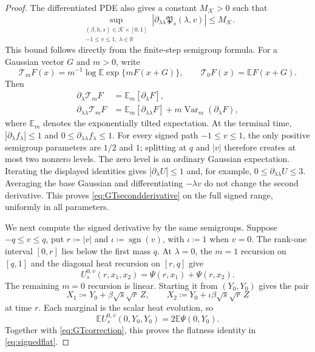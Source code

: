 \documentclass[11pt]{article}
\numberwithin{equation}{section}
\newcommand{\E}{\mathbb{E}}
\newcommand{\1}{\mathbf 1}
\newcommand{\cK}{\mathcal K}
\newcommand{\Var}{\operatorname{Var}}
\begin{document}
\begin{proof}
The differentiated PDE also gives a constant $M_{\cK}>0$ such that
\begin{equation}
 \sup_{\substack{(\beta,h,s)\in\cK\times[0,1]\\
                  -1\le v\le1,\ \lambda\in\mathbb R}}
 |\partial_{\lambda\lambda}\mathfrak P_s(\lambda,v)|
 \le M_{\cK}.
 \label{eq:GTsecondderivative}
\end{equation}
This bound follows directly from the finite-step semigroup formula.
For a Gaussian vector $G$ and $m>0$, write
\[
 \mathcal T_mF(x)=m^{-1}\log\E\exp\{mF(x+G)\},
 \qquad \mathcal T_0F(x)=\E F(x+G).
\]
Then
\begin{align*}
 \partial_\lambda\mathcal T_mF
 &=\E_m[\partial_\lambda F],\\
 \partial_{\lambda\lambda}\mathcal T_mF
 &=\E_m[\partial_{\lambda\lambda}F]
   +m\Var_m(\partial_\lambda F),
\end{align*}
where $\E_m$ denotes the exponentially tilted expectation.  At the
terminal time, $|\partial_\lambda f_\lambda|\le1$ and
$0\le\partial_{\lambda\lambda}f_\lambda\le1$.  For every signed path
$-1\le v\le1$, the only positive semigroup parameters are $1/2$ and
$1$; splitting at $q$ and $|v|$ therefore creates at most two
nonzero levels.  The zero level is an ordinary Gaussian expectation.
Iterating the displayed identities gives
$|\partial_\lambda U|\le1$ and, for example,
$0\le\partial_{\lambda\lambda}U\le3$.  Averaging the base Gaussian and
differentiating $-\lambda v$ do not change the second derivative.
This proves \eqref{eq:GTsecondderivative} on the full signed range,
uniformly in all parameters.

We next compute the signed derivative by the same semigroups.  Suppose
$-q\le v\le q$, put $r\coloneqq|v|$ and
$\iota\coloneqq\operatorname{sgn}(v)$, with $\iota\coloneqq1$ when
$v=0$.  The
rank-one interval $[0,r]$ lies below the first mass $q$.  At
$\lambda=0$, the $m=1$ recursion on $[q,1]$ and the diagonal heat
recursion on $[r,q]$ give
\[
 U_s^{0,v}(r,x_1,x_2)=\Psi(r,x_1)+\Psi(r,x_2).
\]
The remaining $m=0$ recursion is linear.  Starting it from
$(Y_0,Y_0)$ gives the pair
\[
 X_1\coloneqq Y_0+\beta\sqrt{s}\sqrt r\,Z,\qquad
 X_2\coloneqq Y_0+\iota\beta\sqrt{s}\sqrt r\,Z
\]
at time $r$.  Each marginal is the scalar heat evolution, so
\[
 \E U_s^{0,v}(0,Y_0,Y_0)=2\E\Psi(0,Y_0).
\]
Together with \eqref{eq:GTcorrection}, this proves the flatness
identity in \eqref{eq:signedflat}.


\end{proof}
\end{document}
